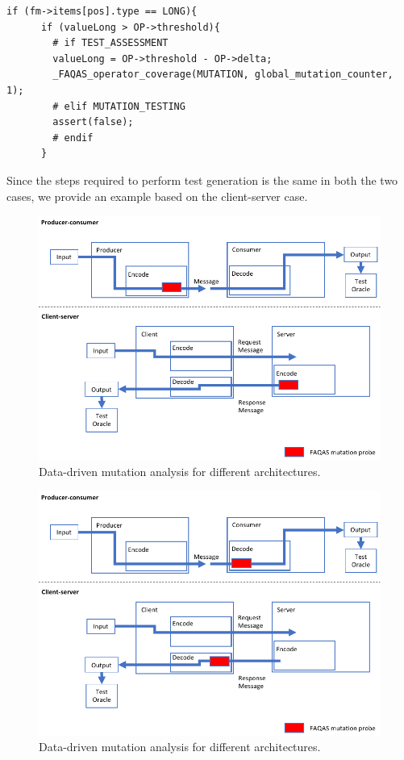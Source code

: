 \begin{lstlisting}[style=CStyle, float=t, caption=\_FAQAS\_mutate excerpt., label=assert]
if (fm->items[pos].type == LONG){
      if (valueLong > OP->threshold){
      	# if TEST_ASSESSMENT
        valueLong = OP->threshold - OP->delta;
        _FAQAS_operator_coverage(MUTATION, global_mutation_counter, 1);
        # elif MUTATION_TESTING
        assert(false);
        # endif
      }
\end{lstlisting}


Since the steps required to perform test generation is the same in both the two cases, we provide an example based on the client-server case.

\begin{figure}[h]
  \centering
    \includegraphics[width=14cm]{images/dataDrivenTestSuiteAugmentationC}
      \caption{Data-driven mutation analysis for different architectures.}
      \label{fig:dataDrivenTestSuiteAugmentationC}
\end{figure}

\begin{figure}[h]
  \centering
    \includegraphics[width=14cm]{images/dataDrivenTestSuiteAugmentationD}
      \caption{Data-driven mutation analysis for different architectures.}
      \label{fig:dataDrivenTestSuiteAugmentationD}
\end{figure}

